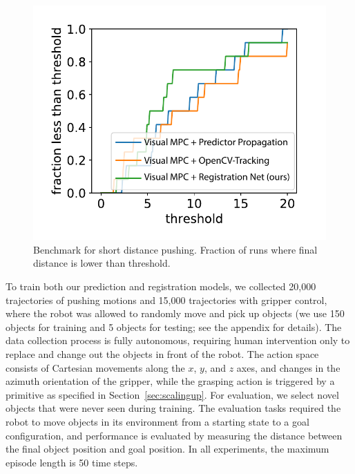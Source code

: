 \begin{figure}
	\vspace{-0.2in}
	\centering
	\includegraphics[width=0.35\columnwidth]{images/pushshort_bench_plots.pdf}
	\vspace{-0.8cm}
	\caption{\small{Benchmark for short distance pushing.  Fraction of runs where final distance is lower than threshold.}}
	\label{fig:push_bench_short}
\end{figure}


To train both our prediction and registration models, we collected 20,000 trajectories of pushing motions and 15,000 trajectories with gripper control, where the robot was allowed to randomly move and pick up objects (we use 150 objects for training and 5 objects for testing; see the appendix for details). The data collection process is fully autonomous, requiring human intervention only to replace and change out the objects in front of the robot.
The action space consists of Cartesian movements along the $x$, $y$, and $z$ axes, and changes in the azimuth orientation of the gripper, while the grasping action is triggered by a primitive as specified in Section~\ref{sec:scalingup}. For evaluation, we select novel objects that were never seen during training. The evaluation tasks required the robot to move objects in its environment from a starting state to a goal configuration, and performance is evaluated by measuring the distance between the final object position and goal position. In all experiments, the maximum episode length is 50 time steps.

\vspace{-0.1in}
